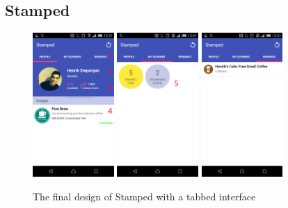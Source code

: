 \subsection{Stamped}
\begin{figure}[H]
 \centering
  \includegraphics[width=0.275\textwidth]{img/moremock2.png}
   \includegraphics[width=0.275\textwidth]{img/finalmock.png}
    \includegraphics[width=0.275\textwidth]{img/moremock1.png}
     \caption{The final design of Stamped with a tabbed interface}
     \label{fig:wireframer3}
\end{figure}

